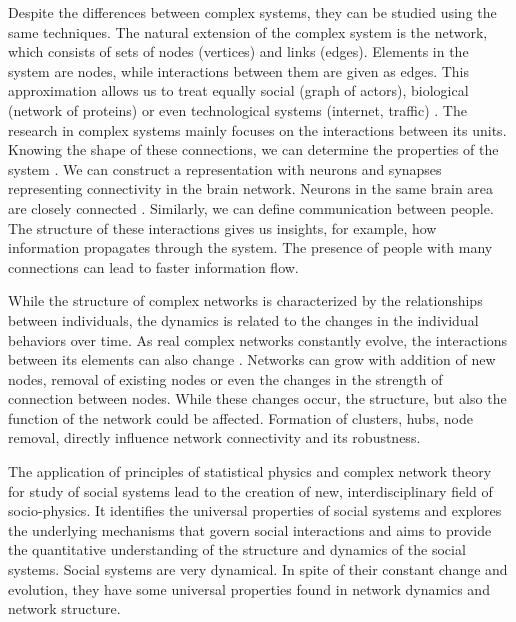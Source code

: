 
Despite the differences between complex systems, they can be studied using the same techniques. The natural extension of the complex system is the network, which consists of sets of nodes (vertices) and links (edges). Elements in the system are nodes, while interactions between them are given as edges. This approximation allows us to treat equally social \cite{myers2014, sarigol2014} (graph of actors), biological (network of proteins) \cite{fraiman2009ising, schneider2011modeling} or even technological systems (internet, traffic) \cite{costa2007characterization, costa2011analyzing, newman2003structure}. The research in complex systems mainly focuses on the interactions between its units. Knowing the shape of these connections, we can determine the properties of the system \cite{ladyman2013}. We can construct a representation with neurons and synapses representing connectivity in the brain network. Neurons in the same brain area are closely connected \cite{latora2017complex}. Similarly, we can define communication between people. The structure of these interactions gives us insights, for example, how information propagates through the system. The presence of people with many connections can lead to faster information flow. 


While the structure of complex networks is characterized by the relationships between individuals, the dynamics is related to the changes in the individual behaviors over time. As real complex networks constantly evolve, the interactions between its elements can also change \cite{thurner2018}. Networks can grow with addition of new nodes, removal of existing nodes or even the changes in the strength of connection between nodes. While these changes occur, the structure, but also the function of the network could be affected. Formation of clusters, hubs, node removal, directly influence network connectivity and its robustness. 

The application of principles of statistical physics and complex network theory for study of social systems lead to the creation of new, interdisciplinary field of socio-physics. It identifies the universal properties of social systems and explores the underlying mechanisms that govern social interactions and aims to provide the quantitative understanding of the structure and dynamics of the social systems. Social systems are very dynamical. In spite of their constant change and evolution, they have some universal properties found in network dynamics and network structure. 

